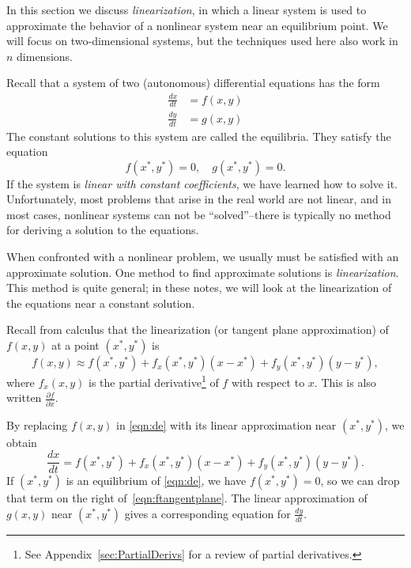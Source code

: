 \documentclass[reqno]{immbook}
\numberwithin{equation}{chapter}
\numberwithin{question}{section}
\numberwithin{theorem}{chapter}
\numberwithin{figure}{chapter}
\theoremstyle{definition}
\begin{document}
In this section we discuss \emph{linearization},
in which a linear system
is used to approximate the behavior of a nonlinear system
near an equilibrium point.
We will focus on two-dimensional systems, but the
techniques used here also work in $n$ dimensions.

Recall that a system of two (autonomous) differential equations has the form
\begin{equation}
\begin{split}
  \frac{dx}{dt} & = f(x,y) \\
  \frac{dy}{dt} & = g(x,y)
\end{split}
\label{eqn:de}
\end{equation}
The constant solutions to this system are called the equilibria.
They satisfy the equation
\begin{equation}
    f(x^*,y^*) = 0, \quad g(x^*,y^*) = 0.
\end{equation}
If the system is \emph{linear with constant
coefficients}, we have learned
how to solve it.  Unfortunately, most problems that arise in the
real world are not linear,
and in most cases, nonlinear systems can not be ``solved''--there is
typically no method for deriving a solution to the equations.

When confronted with a nonlinear problem, we usually must
be satisfied with an approximate solution.
One method to find approximate solutions is \emph{linearization}.
This method is quite general; in these notes, we will look at the
linearization of the equations near a constant solution.

Recall from calculus
that the linearization (or tangent plane approximation)
of $f(x,y)$ at a point $(x^*,y^*)$ is
\begin{equation}
  f(x,y) \approx f(x^*,y^*)+f_x(x^*,y^*)(x-x^*) + f_y(x^*,y^*)(y-y^*),
\end{equation}
where $f_x(x,y)$ is the partial derivative\footnote{%
See Appendix~\ref{sec:PartialDerivs} for a review
of partial derivatives.}
of $f$ with respect to $x$.
This is also written $\frac{\partial f}{\partial x}$.

By replacing $f(x,y)$ in \eqref{eqn:de}
with its linear approximation near $(x^*,y^*)$,
we obtain
\begin{equation}
   \frac{dx}{dt} = f(x^*,y^*)+f_x(x^*,y^*)(x-x^*) + f_y(x^*,y^*)(y-y^*).
   \label{eqn:ftangentplane}
\end{equation}
If $(x^*,y^*)$ is an equilibrium of \eqref{eqn:de}, we have
$f(x^*,y^*)=0$, so we can drop that term on the right
of~\eqref{eqn:ftangentplane}.
The linear approximation of $g(x,y)$ near $(x^*,y^*)$ gives
a corresponding equation for $\frac{dy}{dt}$.
\end{document}
